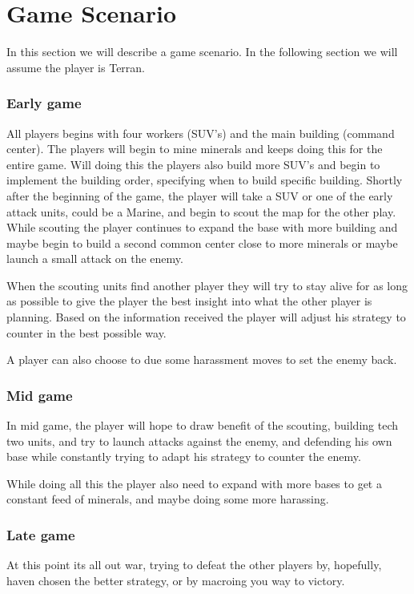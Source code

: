 \section{Game Scenario}
	In this section we will describe a game scenario. In the following section we will assume the player is Terran.
	
	\subsubsection{Early game}
		All players begins with four workers (SUV's) and the main building (command center).	The players will begin to mine minerals and keeps doing this for the entire game. Will doing this the players also build more SUV's and begin to implement the building order, specifying when to build specific building. Shortly after the beginning of the game, the player will take a SUV or one of the early attack units, could be a Marine, and begin to scout the map for the other play. 
		While scouting the player continues to expand the base with more building and maybe begin to build a second common center close to more minerals or maybe launch a small attack on the enemy.
		
		When the scouting units find another player they will try to stay alive for as long as possible to give the player the best insight into what the other player is planning. Based on the information received the player will adjust his strategy to counter in the best possible way.
		
		A player can also choose to due some harassment moves to set the enemy back.
		
	\subsubsection{Mid game}
		In mid game, the player will hope to draw benefit of the scouting, building tech two units, and try to launch attacks against the enemy, and defending his own base while constantly trying to adapt his strategy to counter the enemy.
		
		While doing all this the player also need to expand with more bases to get a constant feed of minerals, and maybe doing some more harassing.
		
	\subsubsection{Late game}
		At this point its all out war, trying to defeat the other players by, hopefully, haven chosen the better strategy, or by macroing you way to victory.